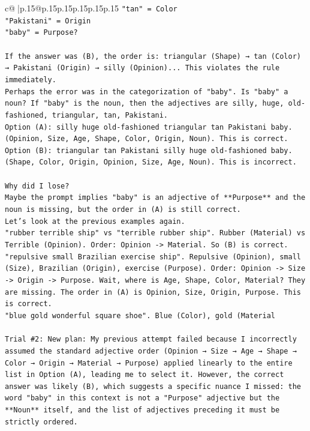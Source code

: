 \documentclass{article}
\begin{document}
{\begin{supertabular}{c@{$\;$}|p{.15\linewidth}@{}p{.15\linewidth}p{.15\linewidth}p{.15\linewidth}p{.15\linewidth}p{.15\linewidth}}
{{{\texttt{"tan" = Color} \\
\texttt{"Pakistani" = Origin} \\
\texttt{"baby" = Purpose?} \\
\\ 
\texttt{If the answer was (B), the order is: triangular (Shape) → tan (Color) → Pakistani (Origin) → silly (Opinion)... This violates the rule immediately.} \\
\texttt{Perhaps the error was in the categorization of "baby". Is "baby" a noun? If "baby" is the noun, then the adjectives are silly, huge, old{-}fashioned, triangular, tan, Pakistani.} \\
\texttt{Option (A): silly huge old{-}fashioned triangular tan Pakistani baby. (Opinion, Size, Age, Shape, Color, Origin, Noun). This is correct.} \\
\texttt{Option (B): triangular tan Pakistani silly huge old{-}fashioned baby. (Shape, Color, Origin, Opinion, Size, Age, Noun). This is incorrect.} \\
\\ 
\texttt{Why did I lose?} \\
\texttt{Maybe the prompt implies "baby" is an adjective of **Purpose** and the noun is missing, but the order in (A) is still correct.} \\
\texttt{Let's look at the previous examples again.} \\
\texttt{"rubber terrible ship" vs "terrible rubber ship". Rubber (Material) vs Terrible (Opinion). Order: Opinion {-}> Material. So (B) is correct.} \\
\texttt{"repulsive small Brazilian exercise ship". Repulsive (Opinion), small (Size), Brazilian (Origin), exercise (Purpose). Order: Opinion {-}> Size {-}> Origin {-}> Purpose. Wait, where is Age, Shape, Color, Material? They are missing. The order in (A) is Opinion, Size, Origin, Purpose. This is correct.} \\
\texttt{"blue gold wonderful square shoe". Blue (Color), gold (Material} \\
\\ 
\texttt{Trial \#2: New plan: My previous attempt failed because I incorrectly assumed the standard adjective order (Opinion → Size → Age → Shape → Color → Origin → Material → Purpose) applied linearly to the entire list in Option (A), leading me to select it. However, the correct answer was likely (B), which suggests a specific nuance I missed: the word "baby" in this context is not a "Purpose" adjective but the **Noun** itself, and the list of adjectives preceding it must be strictly ordered.} \\
}}}
\end{supertabular}}
\end{document}
